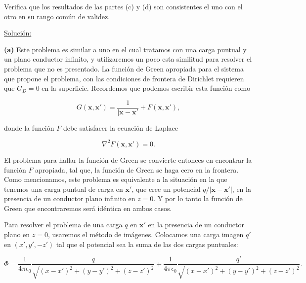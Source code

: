 \documentclass[a4paper,10pt]{article}
\numberwithin{equation}{section}
\begin{document}
Verifica que los resultados de las partes (c) y (d) son consistentes el uno 
con el otro en su rango común de validez.

\vspace{.3cm}

\underline{Solución:} \vspace{.3cm}

\textbf{(a)} Este problema es similar a uno en el cual tratamos con una carga puntual y un plano 
conductor infinito, y utilizaremos un poco esta similitud para resolver el problema 
que no es presentado. La función de Green apropiada para el sistema que propone el 
problema, con las condiciones de frontera de Dirichlet requieren que $G_D = 0$ en la 
superficie. Recordemos que podemos escribir esta función como 

\begin{equation}
 G(\mathbf{x},\mathbf{x}') = \frac{1}{|\mathbf{x} - \mathbf{x}'} + 
 F(\mathbf{x},\mathbf{x}'),
\end{equation}

donde la función $F$ debe satisfacer la ecuación de Laplace 

\begin{equation}
 \nabla^2F(\mathbf{x},\mathbf{x}') = 0.
\end{equation}

El problema para hallar la función de Green se convierte entonces en encontrar 
la función $F$ apropiada, tal que, la función de Green se haga cero en la frontera. 
Como mencionamos, este problema es equivalente a la situación en la que tenemos una 
carga puntual de carga en $\mathbf{x}'$, que cree un potencial $q/|\mathbf{x}-
\mathbf{x}'|$, en la presencia de un conductor plano infinito en $z = 0$. Y por lo 
tanto la función de Green que encontraremos será idéntica en ambos casos. 

\vspace{.3cm}

Para resolver el problema de una carga $q$ en $\mathbf{x}'$ en la presencia de un 
conductor plano en $z = 0$, usaremos el método de imágenes. Colocamos una carga 
imagen $q'$ en $(x',y',-z')$ tal que el potencial sea la suma de las dos cargas 
puntuales:

\begin{equation*}
 \Phi = \frac{1}{4\pi\epsilon_0}\frac{q}{\sqrt{(x-x')^2 + (y-y')^2 + (z-z')^2}} + 
 \frac{1}{4\pi\epsilon_0}\frac{q'}{\sqrt{(x-x')^2 + (y-y')^2 + (z-z')^2}}.
\end{equation*}
\end{document}
